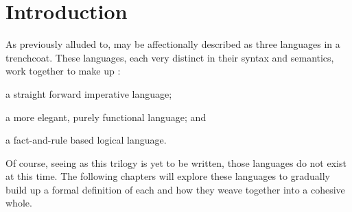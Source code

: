 \section{Introduction}

As previously alluded to, \Trilogy{} may be affectionally  described
as three languages in a trenchcoat. These languages, each very distinct in
their syntax and semantics, work together to make up \Trilogy{}:

\begin{description}[labelindent=1.5em]
    \item[Prose] a straight forward imperative language;
    \item[Poetry] a more elegant, purely functional language; and
    \item[Law] a fact-and-rule based logical language.
\end{description}

\noindent
Of course, seeing as this trilogy is yet to be written, those languages do not
exist at this time. The following chapters will explore these languages to
gradually build up a formal definition of each and how they weave together
into a cohesive whole.
